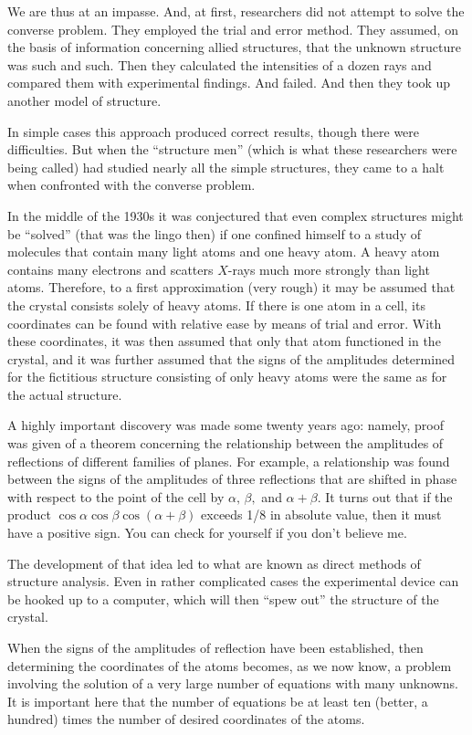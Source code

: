 We are thus at an impasse. And, at first, researchers did not attempt to solve the converse problem. They employed the trial and error method. They assumed, on the basis of information concerning allied structures, that the unknown structure was such and such. Then they calculated the intensities of a dozen rays and compared them with experimental findings. And failed. And then they took up another model of structure.

In simple cases this approach produced correct results, though there were difficulties. But when the ``structure men'' (which is what these researchers were being called) had studied nearly all the simple structures, they came to a halt when confronted with the converse problem.

In the middle of the 1930s it was conjectured that even complex structures might be ``solved'' (that was the lingo then) if one confined himself to a study of molecules that contain many light atoms and one heavy atom. A heavy atom contains many electrons and scatters $X$-rays much more strongly than light atoms. Therefore, to a first approximation (very rough) it may be assumed that the crystal consists solely of heavy atoms. If there is one atom in a cell, its coordinates can be found with rela­tive ease by means of trial and error. With these coordi­nates, it was then assumed that only that atom functioned in the crystal, and it was further assumed that the signs of the amplitudes determined for the fictitious struc­ture consisting of only heavy atoms were the same as for the actual structure.

A highly important discovery was made some twenty years ago: namely, proof was given of a theorem concern­ing the relationship between the amplitudes of reflections of different families of planes. For example, a relationship was found between the signs of the amplitudes of three reflections that are shifted in phase with respect to the point of the cell by $\alpha,\, \beta,$ and $\alpha + \beta$. It turns out that if the product $\cos \alpha \cos \beta \cos (\alpha+\beta)$ exceeds 1/8 in absolute value, then it must have a positive sign. You can check for yourself if you don't believe me.

The development of that idea led to what are known as direct methods of structure analysis. Even in rather com­plicated cases the experimental device can be hooked up to a computer, which will then ``spew out'' the structure of the crystal.

When the signs of the amplitudes of reflection have been established, then determining the coordinates of the atoms becomes, as we now know, a problem involving the solution of a very large number of equations with many unknowns. It is important here that the number of equa­tions be at least ten (better, a hundred) times the number of desired coordinates of the atoms.

